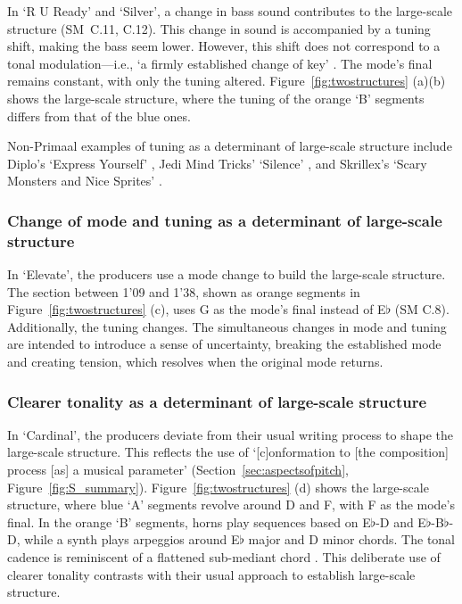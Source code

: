 \documentclass{article}
\begin{document}
In `R U Ready' and `Silver', a change in bass sound contributes to the large-scale structure (SM~C.11, C.12). This change in sound is accompanied by a tuning shift, making the bass seem lower. However, this shift does not correspond to a tonal modulation---i.e., `a firmly established change of key' \citep{saslaw2001modulation}. The mode's final remains constant, with only the tuning altered. Figure~\ref{fig:twostructures} (a)(b) shows the large-scale structure, where the tuning of the orange `B' segments differs from that of the blue ones.

Non-Primaal examples of tuning as a determinant of large-scale structure include Diplo's `Express Yourself' \citep[1'19--1'37]{diplo2012expressyourself}, Jedi Mind Tricks' `Silence' \citep[1'00--1'11 and 2'01--2'12]{jedimind2009}, and Skrillex's `Scary Monsters and Nice Sprites' \citep{skrillex2011scary}.%

\subsubsection{Change of mode and tuning as a determinant of large-scale structure}

In `Elevate', the producers use a mode change to build the large-scale structure. The section between 1'09 and 1'38, shown as orange segments in Figure~\ref{fig:twostructures} (c), uses G as the mode's final instead of E$\flat$ (SM C.8). Additionally, the tuning changes. The simultaneous changes in mode and tuning are intended to introduce a sense of uncertainty, breaking the established mode and creating tension, which resolves when the original mode returns.


\subsubsection{Clearer tonality as a determinant of large-scale structure}\label{sec:clearertonalitylarge}

In `Cardinal', the producers deviate from their usual writing process to shape the large-scale structure. This reflects the use of `[c]onformation to [the composition] process [as] a musical parameter' (Section~\ref{sec:aspectsofpitch}, Figure~\ref{fig:S_summary}). Figure~\ref{fig:twostructures} (d) shows the large-scale structure, where blue `A' segments revolve around D and F, with F as the mode's final. In the orange `B' segments, horns play sequences based on E$\flat$-D and E$\flat$-B$\flat$-D, while a synth plays arpeggios around E$\flat$ major and D minor chords. The tonal cadence is reminiscent of a flattened sub-mediant chord \citep[p.~120]{forte1979tonal}. This deliberate use of clearer tonality contrasts with their usual approach to establish large-scale structure.
\end{document}
